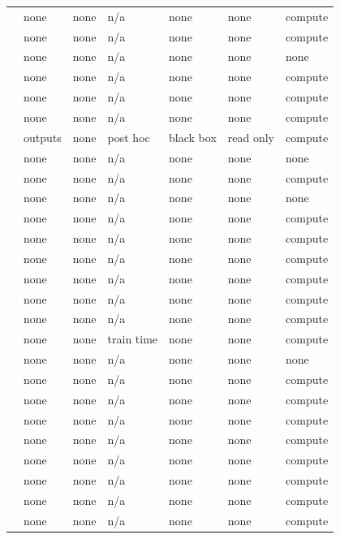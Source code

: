 \begin{landscape}
\begin{longtable}{rllllll}
\cite{LZZ24} & none & none & n/a & none & none & compute \\
\cite{SZB21} & none & none & n/a & none & none & compute \\
\cite{HS24} & none & none & n/a & none & none & none \\
\cite{HW21} & none & none & n/a & none & none & compute \\
\cite{YHGA25} & none & none & n/a & none & none & compute \\
\cite{AGJ21} & none & none & n/a & none & none & compute \\
\cite{DM22} & outputs & none & post hoc & black box & read only & compute \\
\cite{BLMST22} & none & none & n/a & none & none & none \\
\cite{EGV25} & none & none & n/a & none & none & compute \\
\cite{SKMTO26} & none & none & n/a & none & none & none \\
\cite{ABM23} & none & none & n/a & none & none & compute \\
\cite{DGKP19} & none & none & n/a & none & none & compute \\
\cite{HN23} & none & none & n/a & none & none & compute \\
\cite{GKY11} & none & none & n/a & none & none & compute \\
\cite{CGGV25} & none & none & n/a & none & none & compute \\
\cite{SW22} & none & none & n/a & none & none & compute \\
\cite{Wei25} & none & none & train time & none & none & compute \\
\cite{CQYKMHBW24} & none & none & n/a & none & none & none \\
\cite{ABM22} & none & none & n/a & none & none & compute \\
\cite{BM09} & none & none & n/a & none & none & compute \\
\cite{WSPX24} & none & none & n/a & none & none & compute \\
\cite{DKLM26} & none & none & n/a & none & none & compute \\
\cite{GJMMW22} & none & none & n/a & none & none & compute \\
\cite{BGHKP24} & none & none & n/a & none & none & compute \\
\cite{LLW19} & none & none & n/a & none & none & compute \\
\cite{BW08} & none & none & n/a & none & none & compute \\

\end{longtable}
\end{landscape}
